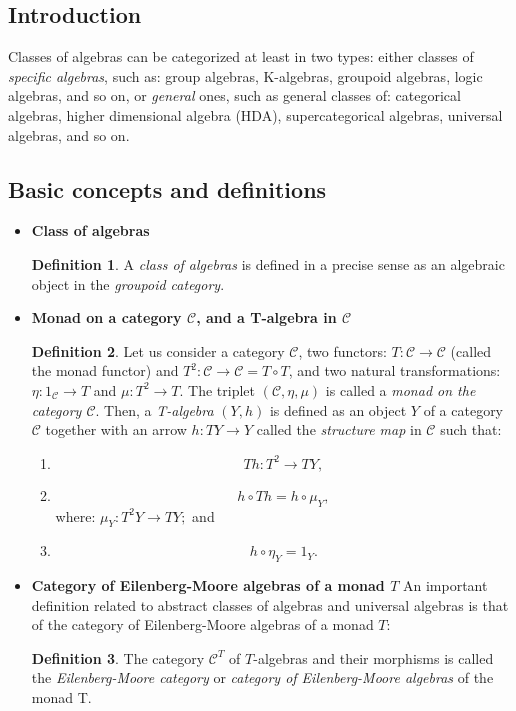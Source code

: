 \documentclass[12pt]{article}
\theoremstyle{plain}
\theoremstyle{definition}
\newtheorem{definition}{Definition}[section]
\numberwithin{equation}{section}
\begin{document}
\subsection{Introduction}
Classes of algebras can be categorized at least in two types: either classes of \emph{specific
algebras}, such as: group algebras, K-algebras, groupoid algebras, logic algebras, and so on, 
or \emph{general} ones, such as general classes of: categorical algebras, higher dimensional algebra
(HDA), supercategorical algebras, universal algebras, and so on.

\subsection{Basic concepts and definitions}

\begin{itemize}
\item {\bf Class of algebras}
\begin{definition}
 A \emph{class of algebras} is defined in a precise sense as an algebraic object in the
\emph{groupoid category}.

\end{definition}

\item {\bf Monad on a category $\mathcal{C}$, and a T-algebra in $\mathcal{C}$}

\begin{definition}
Let us consider a category $\mathcal{C}$, two functors: $T: \mathcal{C} \to \mathcal{C}$ (called the monad functor) and $T^2: \mathcal{C} \to \mathcal{C} = T \circ T$, and two natural transformations:
$\eta: 1_ \mathcal{C} \to T$ and $\mu: T^2 \to T$. The triplet $(\mathcal{C},\eta,\mu)$
is called a {\em monad on the category $\mathcal{C}$}. Then, a {\em T-algebra} $(Y,h)$ is defined as an object $Y$ of a category $\mathcal{C}$ together with an arrow $h: TY \to Y $ called the {\em structure map} in  $\mathcal{C}$ such that:

\begin{enumerate}
\item $$Th: T^2 \to TY,$$ 

\item $$h \circ Th = h \circ \mu_Y,$$
 where: $\mu_Y: T^2 Y \to TY;$ and

\item $$ h \circ \eta_Y = 1_Y.$$
\end{enumerate}

\end{definition}

\item {\bf Category of Eilenberg-Moore algebras of a monad $T$}
An important definition related to abstract classes of algebras and universal algebras is that of the category of Eilenberg-Moore algebras of a monad $T$:
 
\begin{definition}
 The category $\mathcal{C}^T$ of $T$-algebras and their morphisms is called the {\em Eilenberg-Moore category} or {\em category of Eilenberg-Moore algebras} of the monad T.
\end{definition}

\end{itemize}
\end{document}
